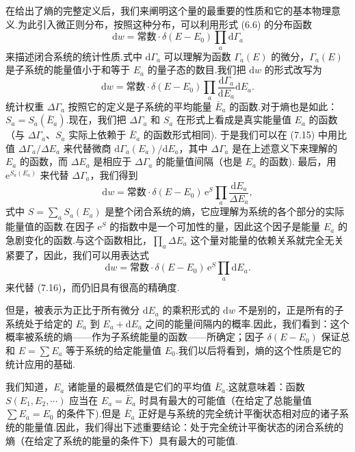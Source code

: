 在给出了熵的完整定义后，我们来阐明这个量的最重要的性质和它的基本物理意义.为此引入微正则分布，按照这种分布，可以利用形式 (6.6) 的分布函数
\begin{equation*}
  \mathrm{d}w=\text{常数}\cdot\delta(E-E_0)\prod_a\mathrm{d}\Gamma_a
\end{equation*}
来描述闭合系统的统计性质.式中 $\mathrm{d}\Gamma_a$ 可以理解为函数 $\Gamma_a(E)$ 的微分，$\Gamma_a(E)$ 是子系统的能量值小于和等于 $E_a$ 的量子态的数目.我们把 $\mathrm{d}w$ 的形式改写为
\begin{equation}
  \mathrm{d}w=\text{常数}\cdot\delta(E-E_0)
  \prod_a\frac{\mathrm{d}\Gamma_a}{\mathrm{d}E_a}\mathrm{d}E_a.
\end{equation}
统计权重 $\Delta\Gamma_a$ 按照它的定义是子系统的平均能量 $\bar{E}_a$ 的函数.对于熵也是如此：$S_a=S_a(\bar{E}_a)$.现在，我们把 $\Delta\Gamma_a$ 和 $S_a$ 在形式上看成是真实能量值 $E_a$ 的函数（与 $\Delta\Gamma_a$、$S_a$ 实际上依赖于 $\bar{E}_a$ 的函数形式相同). 于是我们可以在 (7.15) 中用比值 $\Delta\Gamma_a/\Delta E_a$ 来代替微商 $\mathrm{d}\Gamma_a(E_a)/\mathrm{d}E_a$，其中 $\Delta\Gamma_a$ 是在上述意义下来理解的 $E_a$ 的函数，而 $\Delta E_a$ 是相应于 $\Delta\Gamma_a$ 的能量值间隔（也是 $E_a$ 的函数). 最后，用 $\mathrm{e}^{S_a(E_a)}$ 来代替 $\Delta\Gamma_a$，我们得到
\begin{equation}
  \mathrm{d}w=\text{常数}\cdot\delta(E-E_0)\,\mathrm{e}^{S}
  \prod_a\frac{\mathrm{d}E_a}{\Delta E_a},
\end{equation}
式中 $S=\sum_a S_a(E_a)$ 是整个闭合系统的熵，它应理解为系统的各个部分的实际能量值的函数.在因子 $\mathrm{e}^{S}$ 的指数中是一个可加性的量，因此这个因子是能量 $E_a$ 的急剧变化的函数.与这个函数相比，$\prod_a\Delta E_a$ 这个量对能量的依赖关系就完全无关紧要了，因此，我们可以用表达式
\begin{equation}
  \mathrm{d}w=\text{常数}\cdot\delta(E-E_0)\,\mathrm{e}^{S}
  \prod_a\mathrm{d}E_a.
\end{equation}
来代替 (7.16)，而仍旧具有很高的精确度.

但是，被表示为正比于所有微分 $\mathrm{d}E_a$ 的乘积形式的 $\mathrm{d}w$ 不是别的，正是所有的子系统处于给定的 $E_a$ 到 $E_a+\mathrm{d}E_a$ 之间的能量间隔内的概率.因此，我们看到：这个概率被系统的熵——作为子系统能量的函数——所确定；因子 $\delta(E-E_0)$ 保证总和 $E=\sum E_a$ 等于系统的给定能量值 $E_0$.我们以后将看到，熵的这个性质是它的统计应用的基础.

我们知道，$E_a$ 诸能量的最概然值是它们的平均值 $\bar{E}_a$.这就意味着：函数 $S(E_1,E_2,\cdots)$ 应当在 $E_a=\bar{E}_a$ 时具有最大的可能值（在给定了总能量值 $\sum E_a=E_0$ 的条件下).但是 $\bar{E}_a$ 正好是与系统的完全统计平衡状态相对应的诸子系统的能量值.因此，我们得出下述重要结论：处于完全统计平衡状态的闭合系统的熵（在给定了系统的能量的条件下）具有最大的可能值.


